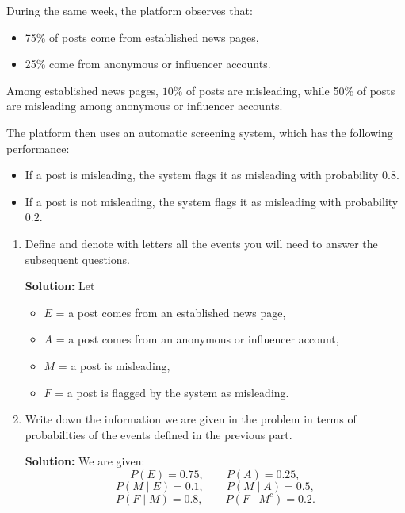 \documentclass[11pt]{exam}
\begin{document}
\begin{questions}
\question[3]
During the same week, the platform observes that:
\begin{itemize}[leftmargin = 0.6cm]
    \item 75\% of posts come from established news pages,
    \item 25\% come from anonymous or influencer accounts.
\end{itemize}
Among established news pages, $10\%$ of posts are misleading, while 50\% of posts are misleading among anonymous or influencer accounts.

The platform then uses an automatic screening system, which has the following performance:
\begin{itemize}[leftmargin = 0.6cm]
    \item If a post is misleading, the system flags it as misleading with probability $0.8$.
    \item If a post is not misleading, the system flags it as misleading with probability $0.2$.
\end{itemize}

\begin{enumerate}[leftmargin = 0.5cm, label = (\alph*), rightmargin = 0.2cm]
    \item Define and denote with letters all the events you will need to answer the subsequent questions.

    \begin{solutionorbox}[6cm]
    \textbf{Solution:}  Let
    \begin{itemize}[leftmargin = 0.6cm]
        \item $E$ = a post comes from an established news page,
        \item $A$ = a post comes from an anonymous or influencer account,
        \item $M$ = a post is misleading,
        \item $F$ = a post is flagged by the system as misleading.
    \end{itemize}
    \end{solutionorbox}

    \item Write down the information we are given in the problem in terms of probabilities of the events defined in the previous part.

    \begin{solutionorbox}[6cm]
    \textbf{Solution:} We are given:
    \[
    P(E)=0.75, \qquad P(A)=0.25,
    \]
    \[
    P(M\mid E)=0.1, \qquad P(M\mid A)=0.5,
    \]
    \[
    P(F\mid M)=0.8, \qquad P(F\mid M^c)=0.2.
    \]
    \end{solutionorbox}
    

\end{enumerate}
\end{questions}
\end{document}
